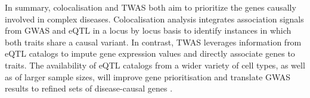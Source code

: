 
In summary, colocalisation and TWAS both aim to prioritize the genes causally involved in complex diseases.
Colocalisation analysis integrates association signals from GWAS and eQTL in a locus by locus basis to identify instances in which both traits share a causal variant. 
In contrast, TWAS leverages information from eQTL catalogs to impute gene expression values and directly associate genes to traits. 
The availability of eQTL catalogs from a wider variety of cell types, as well as of larger sample sizes, will improve gene prioritisation and translate GWAS results to refined sets of disease-causal genes \cite{cano2020gwas}.



